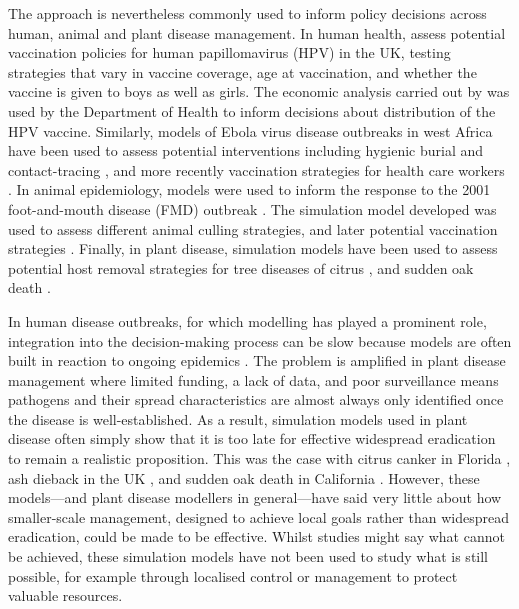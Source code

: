 The approach is nevertheless commonly used to inform policy decisions across human, animal and plant disease management. In human health, \citet{jit_economic_2008} assess potential vaccination policies for human papillomavirus (HPV) in the UK, testing strategies that vary in vaccine coverage, age at vaccination, and whether the vaccine is given to boys as well as girls. The economic analysis carried out by \citet{jit_economic_2008} was used by the Department of Health to inform decisions about distribution of the HPV vaccine. Similarly, models of Ebola virus disease outbreaks in west Africa have been used to assess potential interventions including hygienic burial and contact-tracing \citep{pandey_strategies_2014}, and more recently vaccination strategies for health care workers \citep{robert_control_2019}. In animal epidemiology, models were used to inform the response to the 2001 foot-and-mouth disease (FMD) outbreak \citep{keeling_models_2005}. The simulation model developed \citep{keeling_dynamics_2001} was used to assess different animal culling strategies, and later potential vaccination strategies \citep{keeling_modelling_2003, tildesley_optimal_2006}. Finally, in plant disease, simulation models have been used to assess potential host removal strategies for tree diseases of citrus \citep{cunniffe_cost-effective_2014,cunniffe_optimising_2015, hyatt-twynam_risk-based_2017, adrakey_evidence-based_2017, craig_grower_2018}, and sudden oak death \citep{cunniffe_modelling_2016}.

In human disease outbreaks, for which modelling has played a prominent role, integration into the decision-making process can be slow because models are often built in reaction to ongoing epidemics \citep{rivers_using_2019}. The problem is amplified in plant disease management where limited funding, a lack of data, and poor surveillance means pathogens and their spread characteristics are almost always only identified once the disease is well-established. As a result, simulation models used in plant disease often simply show that it is too late for effective widespread eradication to remain a realistic proposition. This was the case with citrus canker in Florida \citep{gottwald_post_2007}, ash dieback in the UK \citep{defra_tree_2014}, and sudden oak death in California \citep{cunniffe_modelling_2016}. However, these models---and plant disease modellers in general---have said very little about how smaller-scale management, designed to achieve local goals rather than widespread eradication, could be made to be effective. Whilst studies might say what cannot be achieved, these simulation models have not been used to study what is still possible, for example through localised control or management to protect valuable resources.

